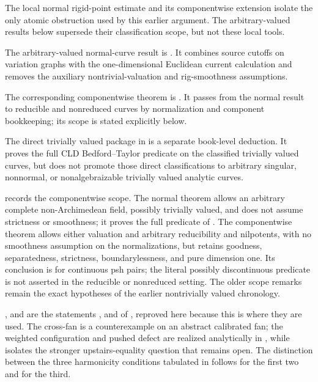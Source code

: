 The local normal rigid-point estimate
 and its componentwise
extension  isolate the only
atomic obstruction used by this earlier argument.  The arbitrary-valued
results below supersede their classification scope, but not these local
tools.

The arbitrary-valued normal-curve result is
.
It combines source cutoffs on variation graphs with the one-dimensional
Euclidean current calculation and removes the auxiliary nontrivial-valuation
and rig-smoothness assumptions.

The corresponding componentwise theorem is
.  It passes from the
normal result to reducible and nonreduced curves by normalization and
component bookkeeping; its scope is stated explicitly below.

The direct trivially valued package in
 is a separate book-level
deduction.  It proves the full CLD Bedford--Taylor predicate on the
classified trivially valued curves, but does not promote those direct
classifications to arbitrary singular, nonnormal, or nonalgebraizable
trivially valued analytic curves.

 records the componentwise
scope.  The normal theorem
 allows an
arbitrary complete non-Archimedean field, possibly trivially valued, and does
not assume strictness or smoothness; it proves the full predicate of
\cite[Definition~8.6.2]{CLD25}.  The componentwise theorem allows either
valuation and arbitrary reducibility and nilpotents, with no smoothness
assumption on the normalizations, but retains goodness, separatedness,
strictness, boundarylessness, and pure dimension one.  Its conclusion is for
continuous psh pairs; the literal possibly discontinuous predicate is not
asserted in the reducible or nonreduced setting.  The older scope remarks
 remain the exact hypotheses of the earlier
nontrivially valued chronology.

,
 and  are the
statements ,
 and  of
, reproved here because this is where they
are used.  The cross-fan is a counterexample on an abstract calibrated fan;
the weighted configuration and pushed defect are realized analytically in
, while
 isolates the stronger
upstairs-equality question that remains open.  The
distinction between the three harmonicity conditions tabulated in
 follows \cite[Remark~7.8.3]{CLD25} for the first
two and \cite{GR25Classical} for the third.

